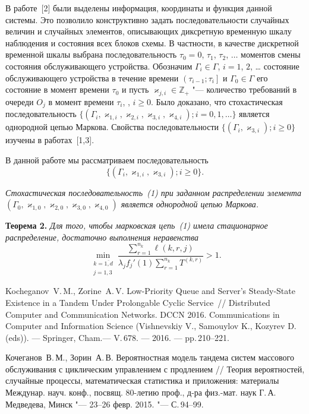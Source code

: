 \begin{ptkarticle}[russian]
В работе~[2] были выделены информация, координаты и функция данной системы. Это
позволило конструктивно задать последовательности случайных величин и случайных
элементов, описывающих диксретную временную шкалу наблюдения и состояния всех
блоков схемы. В частности, в качестве дискретной временной шкалы выбрана
последовательность $\tau_0=0$, $\tau_1$, $\tau_2$, $\ldots$ моментов смены
состояния обслуживающего устройства. Обозначим $\Gamma_i\in\Gamma$, $i=1$, $2$,
\ldots{} состояние обслуживающего устройства в течение времени
$\left(\tau_{i-1};\tau_i\right]$ и $\Gamma_0\in \Gamma$ его состояние в момент
времени $\tau_0$ и пусть $\varkappa_{j,i} \in \mathbb{Z}_+ $ "--- количество
требований в очереди $O_j$ в момент времени $\tau_i$, , $i\geqslant 0$.  
Было доказано, что стохастическая последовательность $\{(\Gamma_i,
\varkappa_{1,i}, \varkappa_{2,i}, \varkappa_{3,i}, \varkappa_{4,i}); i=0, 1,
\ldots\}$ является однородной цепью Маркова. Свойства последовательности $\{(\Gamma_i,\varkappa_{3,i}); i \geqslant 0\}$ изучены в работах~[1,3].



В данной работе мы рассматриваем последовательность  
\[
\{(\Gamma_i,
\varkappa_{1,i},\varkappa_{3,i}); i \geqslant 0\}. \tag{1} 
\]

  {\itshape 
  Стохастическая последовательность~(1)
  при заданном распределении элемента $(\Gamma_0, \varkappa_{1,0},
  \varkappa_{2,0}, \varkappa_{3,0}, \varkappa_{4,0})$ является однородной цепью
  Маркова.  
}

\smallskip

\noindent
{\bfseries Теорема 2.}
{\itshape
Для того, чтобы марковская цепь~(1) имела стационарное распределение,  достаточно выполнения неравенства 
$$
\min_{\substack{k=\overline{1,d}\\ j=1,3}} { \frac{\sum_{r = 1}^{n_k} \ell(k,r,j) }{\lambda_j f_j'(1) \sum_{r=1}^{n_k} T^{(k,r)} }}>1.
$$
}


\begin{ptkreferences}
\item
Kocheganov~V.\,M., Zorine~A.\,V. Low-Priority Queue and Server’s Steady-State
Existence in a Tandem Under Prolongable Cyclic Service~//  Distributed Computer
and Communication Networks. DCCN 2016. Communications in Computer and
Information Science (Vishnevskiy V., Samouylov K., Kozyrev D. (eds)). ---
Springer, Cham.--- V.\,678. --- 2016. --- pp.\,210--221. 
\item
Кочеганов~В.\,М., Зорин~А.\,В. Вероятностная модель тандема систем массового обслуживания с циклическим управлением с продлением // Теория вероятностей, случайные процессы, математическая статистика и приложения: материалы Междунар. науч. конф., посвящ. 80-летию проф., д-ра физ.-мат. наук Г.\,А. Медведева, Минск "--- 23–26 февр. 2015. "--- С.\,94--99.


\end{ptkreferences}
\end{ptkarticle}
